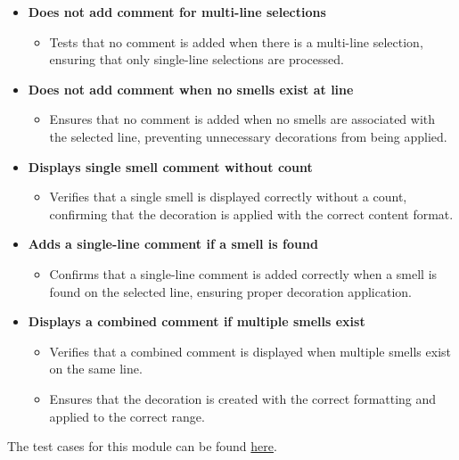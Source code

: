 \documentclass[12pt, titlepage]{article}
\begin{document}
\begin{enumerate}[label={\bf \textcolor{Maroon}{test-SRT-\arabic*}}, wide=0pt, font=\itshape]
\begin{itemize}
    \item \textbf{Does not add comment for multi-line selections}
    \begin{itemize}
        \item Tests that no comment is added when there is a multi-line selection, ensuring that only single-line selections are processed.
    \end{itemize}

    \item \textbf{Does not add comment when no smells exist at line}
    \begin{itemize}
        \item Ensures that no comment is added when no smells are associated with the selected line, preventing unnecessary decorations from being applied.
    \end{itemize}

    \item \textbf{Displays single smell comment without count}
    \begin{itemize}
        \item Verifies that a single smell is displayed correctly without a count, confirming that the decoration is applied with the correct content format.
    \end{itemize}

    \item \textbf{Adds a single-line comment if a smell is found}
    \begin{itemize}
        \item Confirms that a single-line comment is added correctly when a smell is found on the selected line, ensuring proper decoration application.
    \end{itemize}

    \item \textbf{Displays a combined comment if multiple smells exist}
    \begin{itemize}
        \item Verifies that a combined comment is displayed when multiple smells exist on the same line.
        \item Ensures that the decoration is created with the correct formatting and applied to the correct range.
    \end{itemize}
\end{itemize}

\noindent The test cases for this module can be found \href{https://github.com/ssm-lab/capstone--sco-vs-code-plugin/blob/plugin-multi-file/test/ui/lineSelection.test.ts}{here}.


\end{enumerate}
\end{document}
